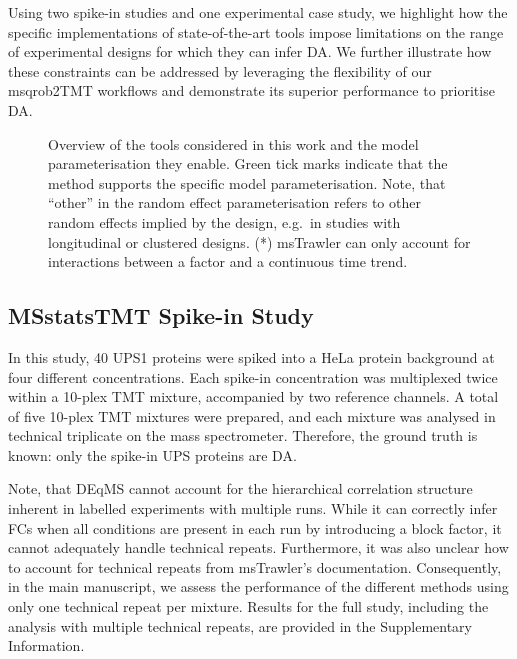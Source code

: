 \documentclass[
  letterpaper,
  DIV=11,
  numbers=noendperiod]{scrartcl}
\begin{document}
Using two spike-in studies and one experimental case study, we highlight
how the specific implementations of state-of-the-art tools impose
limitations on the range of experimental designs for which they can
infer DA. We further illustrate how these constraints can be addressed
by leveraging the flexibility of our msqrob2TMT workflows and
demonstrate its superior performance to prioritise DA.

\begin{figure}[H]


\caption{\label{fig-model_overview}Overview of the tools considered in
this work and the model parameterisation they enable. Green tick marks
indicate that the method supports the specific model parameterisation.
Note, that ``other'' in the random effect parameterisation refers to
other random effects implied by the design, e.g.~in studies with
longitudinal or clustered designs. (*) msTrawler can only account for
interactions between a factor and a continuous time trend.}

\end{figure}%

\subsection{MSstatsTMT Spike-in Study}

In this study, 40 UPS1 proteins were spiked into a HeLa protein
background at four different concentrations. Each spike-in concentration
was multiplexed twice within a 10-plex TMT mixture, accompanied by two
reference channels. A total of five 10-plex TMT mixtures were prepared,
and each mixture was analysed in technical triplicate on the mass
spectrometer. Therefore, the ground truth is known: only the spike-in
UPS proteins are DA.

Note, that DEqMS cannot account for the hierarchical correlation
structure inherent in labelled experiments with multiple runs. While it
can correctly infer FCs when all conditions are present in each run by
introducing a block factor, it cannot adequately handle technical
repeats. Furthermore, it was also unclear how to account for technical
repeats from msTrawler's documentation. Consequently, in the main
manuscript, we assess the performance of the different methods using
only one technical repeat per mixture. Results for the full study,
including the analysis with multiple technical repeats, are provided in
the Supplementary Information.
\end{document}
